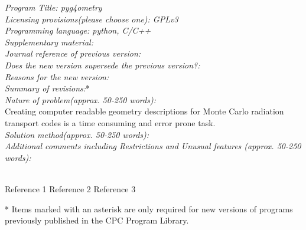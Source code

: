 \documentclass[final,5p,times,twocolumn]{elsarticle}
\begin{document}
\begin{small}
\noindent
{\em Program Title: pyg4ometry }                                         		\\
{\em Licensing provisions(please choose one): GPLv3 }			\\
{\em Programming language: python, C/C++}                         		\\

{\em Supplementary material:}                                 				\\
{\em Journal reference of previous version:}                  			\\
{\em Does the new version supersede the previous version?:}   	\\
{\em Reasons for the new version:}							\\
{\em Summary of revisions:}*								\\

{\em Nature of problem(approx. 50-250 words):}\\
Creating computer readable geometry descriptions for Monte Carlo radiation transport codes is a time consuming and error prone task.  \\
{\em Solution method(approx. 50-250 words):}\\
{\em Additional comments including Restrictions and Unusual features (approx. 50-250 words):}\\
   \\

\begin{thebibliography}{0}
Reference 1         %
Reference 2         %
Reference 3         %
\end{thebibliography}
* Items marked with an asterisk are only required for new versions
of programs previously published in the CPC Program Library.\\
\end{small}
\end{document}
